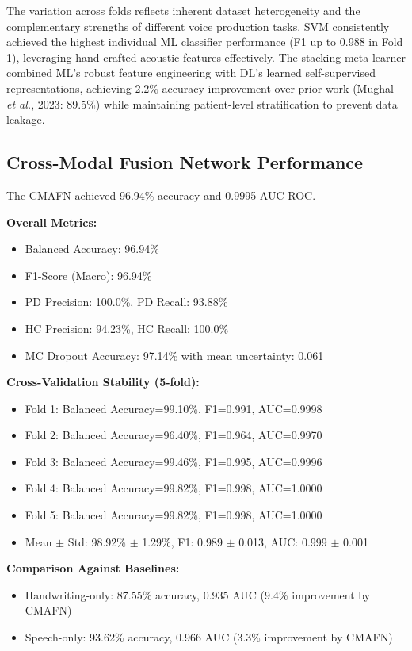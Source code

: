 \documentclass[10pt,conference,letterpaper]{IEEEtran}
\begin{document}
The variation across folds reflects inherent dataset heterogeneity and the complementary strengths of different voice production tasks. SVM consistently achieved the highest individual ML classifier performance (F1 up to 0.988 in Fold 1), leveraging hand-crafted acoustic features effectively. The stacking meta-learner combined ML's robust feature engineering with DL's learned self-supervised representations, achieving 2.2\% accuracy improvement over prior work (Mughal \textit{et al.}, 2023: 89.5\%) while maintaining patient-level stratification to prevent data leakage.

\subsection{Cross-Modal Fusion Network Performance}

The CMAFN achieved 96.94\% accuracy and 0.9995 AUC-ROC.

\textbf{Overall Metrics:}
\begin{itemize}
    \item Balanced Accuracy: 96.94\%
    \item F1-Score (Macro): 96.94\%
    \item PD Precision: 100.0\%, PD Recall: 93.88\%
    \item HC Precision: 94.23\%, HC Recall: 100.0\%
    \item MC Dropout Accuracy: 97.14\% with mean uncertainty: 0.061
\end{itemize}

\textbf{Cross-Validation Stability (5-fold):}
\begin{itemize}
    \item Fold 1: Balanced Accuracy=99.10\%, F1=0.991, AUC=0.9998
    \item Fold 2: Balanced Accuracy=96.40\%, F1=0.964, AUC=0.9970
    \item Fold 3: Balanced Accuracy=99.46\%, F1=0.995, AUC=0.9996
    \item Fold 4: Balanced Accuracy=99.82\%, F1=0.998, AUC=1.0000
    \item Fold 5: Balanced Accuracy=99.82\%, F1=0.998, AUC=1.0000
    \item Mean $\pm$ Std: 98.92\% $\pm$ 1.29\%, F1: 0.989 $\pm$ 0.013, AUC: 0.999 $\pm$ 0.001
\end{itemize}

\textbf{Comparison Against Baselines:}
\begin{itemize}
    \item Handwriting-only: 87.55\% accuracy, 0.935 AUC (9.4\% improvement by CMAFN)
    \item Speech-only: 93.62\% accuracy, 0.966 AUC (3.3\% improvement by CMAFN)
\end{itemize}
\end{document}
